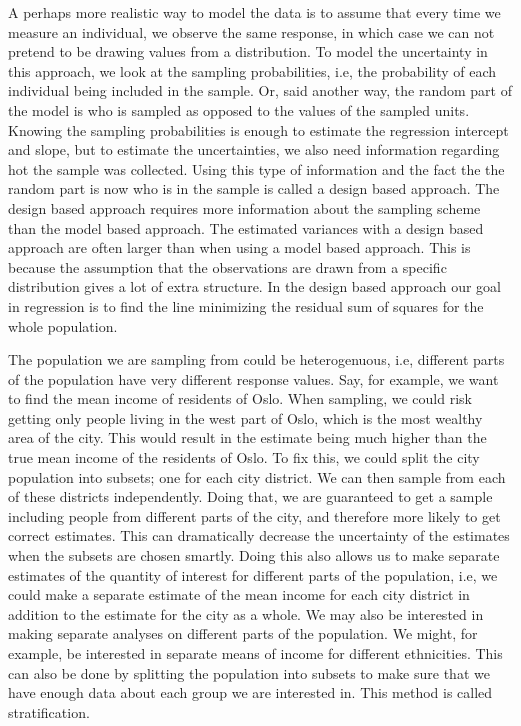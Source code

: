 \documentclass{article}
\begin{document}
A perhaps more realistic way to model the data is to assume that every time we measure an
individual, we observe the same response, in which case we can not pretend to be drawing
values from a distribution. To model the uncertainty in this approach, we look at
the sampling probabilities, i.e, the probability of each individual being
included in the sample. Or, said another way, the random part of the model
is who is sampled as opposed to the values of the sampled units. Knowing the sampling probabilities is enough to
estimate the regression intercept and slope, but to estimate the uncertainties,
we also need information regarding hot the sample was collected.
Using this type of information and the fact the the random part is now who is in
the sample is called a design based approach. The design based approach requires
more information about the sampling scheme than the model based approach. The
estimated variances with a design based approach are often larger than when
using a model based approach. This is because the
assumption that the observations are drawn from a specific distribution gives a
lot of extra structure. In the design based approach our goal in regression is
to find the line minimizing the residual sum of squares for the whole population.

The population we are sampling from could be heterogenuous, i.e, different
parts of the population have very different response values. Say, for example, we want
to find the mean income of residents of Oslo. When sampling, we could risk
getting only people living in the west part of Oslo, which is the most wealthy
area of the city. This would result in the estimate being much higher than the true
mean income of the residents of Oslo. To fix this, we could split
the city population into subsets; one for each city district. We can then sample
from each of these districts independently. Doing that, we are guaranteed to get
a sample including people from different parts of the city, and therefore
more likely to get correct estimates. This can dramatically decrease the
uncertainty of the estimates when the subsets are chosen smartly. Doing this also allows us to make
separate estimates of the quantity of interest for different parts of the
population, i.e, we could make a separate estimate of the mean income for each city
district in addition to the estimate for the city as a whole. We may also be
interested in making separate analyses on different parts of the population. We
might, for example, be interested in separate means of income for different
ethnicities. This can also be done by splitting the population into subsets to
make sure that we have enough data about each group we are interested in. This method is
called stratification.
\end{document}
